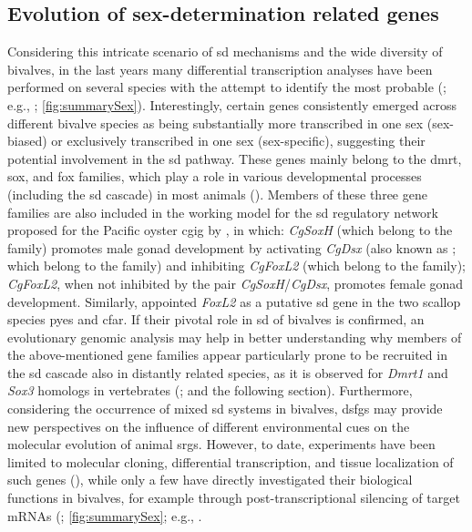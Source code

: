 \subsection{Evolution of sex-determination related genes}
Considering this intricate scenario of \gls{sd} mechanisms and the wide diversity of bivalves, in the last years many differential transcription analyses have been performed on several species with the attempt to identify the most probable  (; e.g., ; \cref{fig:summarySex}). Interestingly, certain genes consistently emerged across different bivalve species as being substantially more transcribed in one sex (sex-biased) or exclusively transcribed in one sex (sex-specific), suggesting their potential involvement in the \gls{sd} pathway. These genes mainly belong to the \gls{dmrt}, \gls{sox}, and \gls{fox} families, which play a role in various developmental processes (including the \gls{sd} cascade) in most animals (). Members of these three gene families are also included in the working model for the \gls{sd} regulatory network proposed for the Pacific oyster \gls{cgig} by , in which: \textit{CgSoxH} (which belong to the  family) promotes male gonad development by activating \textit{CgDsx} (also known as ; which belong to the  family) and inhibiting \textit{CgFoxL2} (which belong to the  family); \textit{CgFoxL2}, when not inhibited by the pair \textit{CgSoxH}/\textit{CgDsx}, promotes female gonad development. Similarly,  appointed \textit{FoxL2} as a putative \gls{sd} gene in the two scallop species \gls{pyes} and \gls{cfar}.
If their pivotal role in \gls{sd} of bivalves is confirmed, an evolutionary genomic analysis may help in better understanding why members of the above-mentioned gene families appear particularly prone to be recruited in the \gls{sd} cascade also in distantly related species, as it is observed for \textit{Dmrt1} and \textit{Sox3} homologs in vertebrates (; and the following section). Furthermore, considering the occurrence of mixed \gls{sd} systems in bivalves, \glspl{dsfg} may provide new perspectives on the influence of different environmental cues on the molecular evolution of animal \glspl{srg}. However, to date, experiments have been limited to molecular cloning, differential transcription, and tissue localization of such genes (), while only a few have directly investigated their biological functions in bivalves, for example through post-transcriptional silencing of target mRNAs (; \cref{fig:summarySex}; e.g., .

